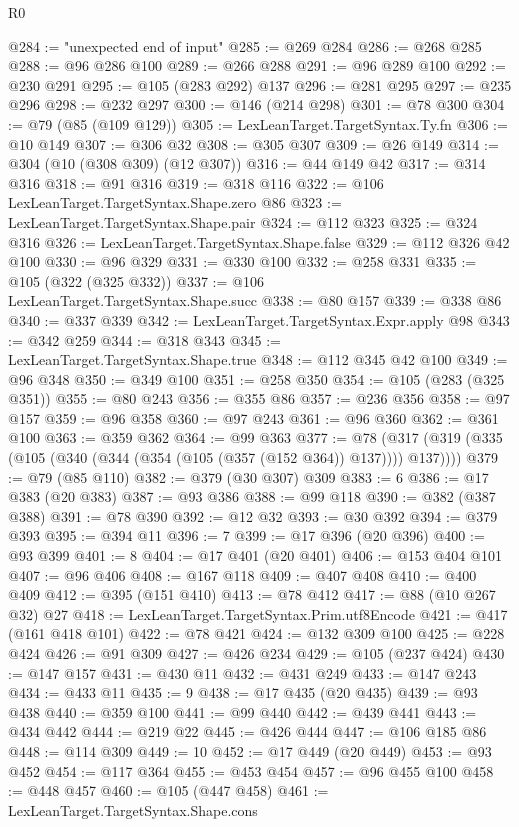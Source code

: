 \begin{lexlean}{R0}
\begin{coremodule}
@284 := "unexpected end of input"
@285 := @269 @284
@286 := @268 @285
@288 := @96 @286 @100
@289 := @266 @288
@291 := @96 @289 @100
@292 := @230 @291
@295 := @105 (@283 @292) @137
@296 := @281 @295
@297 := @235 @296
@298 := @232 @297
@300 := @146 (@214 @298)
@301 := @78 @300
@304 := @79 (@85 (@109 @129))
@305 := LexLeanTarget.TargetSyntax.Ty.fn
@306 := @10 @149
@307 := @306 @32
@308 := @305 @307
@309 := @26 @149
@314 := @304 (@10 (@308 @309) (@12 @307))
@316 := @44 @149 @42
@317 := @314 @316
@318 := @91 @316
@319 := @318 @116
@322 := @106 LexLeanTarget.TargetSyntax.Shape.zero @86
@323 := LexLeanTarget.TargetSyntax.Shape.pair
@324 := @112 @323
@325 := @324 @316
@326 := LexLeanTarget.TargetSyntax.Shape.false
@329 := @112 @326 @42 @100
@330 := @96 @329
@331 := @330 @100
@332 := @258 @331
@335 := @105 (@322 (@325 @332))
@337 := @106 LexLeanTarget.TargetSyntax.Shape.succ
@338 := @80 @157
@339 := @338 @86
@340 := @337 @339
@342 := LexLeanTarget.TargetSyntax.Expr.apply @98
@343 := @342 @259
@344 := @318 @343
@345 := LexLeanTarget.TargetSyntax.Shape.true
@348 := @112 @345 @42 @100
@349 := @96 @348
@350 := @349 @100
@351 := @258 @350
@354 := @105 (@283 (@325 @351))
@355 := @80 @243
@356 := @355 @86
@357 := @236 @356
@358 := @97 @157
@359 := @96 @358
@360 := @97 @243
@361 := @96 @360
@362 := @361 @100
@363 := @359 @362
@364 := @99 @363
@377 := @78 (@317 (@319 (@335 (@105 (@340 (@344 (@354 (@105 (@357 (@152 @364)) @137)))) @137))))
@379 := @79 (@85 @110)
@382 := @379 (@30 @307) @309
@383 := 6
@386 := @17 @383 (@20 @383)
@387 := @93 @386
@388 := @99 @118
@390 := @382 (@387 @388)
@391 := @78 @390
@392 := @12 @32
@393 := @30 @392
@394 := @379 @393
@395 := @394 @11
@396 := 7
@399 := @17 @396 (@20 @396)
@400 := @93 @399
@401 := 8
@404 := @17 @401 (@20 @401)
@406 := @153 @404 @101
@407 := @96 @406
@408 := @167 @118
@409 := @407 @408
@410 := @400 @409
@412 := @395 (@151 @410)
@413 := @78 @412
@417 := @88 (@10 @267 @32) @27
@418 := LexLeanTarget.TargetSyntax.Prim.utf8Encode
@421 := @417 (@161 @418 @101)
@422 := @78 @421
@424 := @132 @309 @100
@425 := @228 @424
@426 := @91 @309
@427 := @426 @234
@429 := @105 (@237 @424)
@430 := @147 @157
@431 := @430 @11
@432 := @431 @249
@433 := @147 @243
@434 := @433 @11
@435 := 9
@438 := @17 @435 (@20 @435)
@439 := @93 @438
@440 := @359 @100
@441 := @99 @440
@442 := @439 @441
@443 := @434 @442
@444 := @219 @22
@445 := @426 @444
@447 := @106 @185 @86
@448 := @114 @309
@449 := 10
@452 := @17 @449 (@20 @449)
@453 := @93 @452
@454 := @117 @364
@455 := @453 @454
@457 := @96 @455 @100
@458 := @448 @457
@460 := @105 (@447 @458)
@461 := LexLeanTarget.TargetSyntax.Shape.cons

\end{coremodule}
\end{lexlean}
